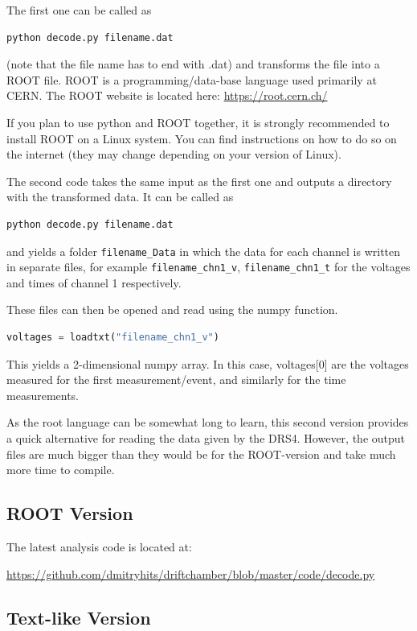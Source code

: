 \documentclass[12pt]{article}
\begin{document}
The first one can be called as
\begin{lstlisting}[language=bash]
  python decode.py filename.dat
\end{lstlisting}
(note that the file name has to end with .dat) and transforms the file into a ROOT file. ROOT is a programming/data-base language used primarily at CERN. The ROOT website is located here:
\url{https://root.cern.ch/}

If you plan to use python and ROOT together, it is strongly recommended to install ROOT on a Linux system. You can find instructions on how to do so on the internet (they may change depending on your version of Linux).

The second code takes the same input as the first one and outputs a directory with the transformed data. It can be called as
\begin{lstlisting}[language=bash]
  python decode.py filename.dat
\end{lstlisting}
and yields a folder \verb|filename_Data| in which the data for each channel is written in separate files, for example \verb|filename_chn1_v|, \verb|filename_chn1_t| for the voltages and times of channel 1 respectively.

These files can then be opened and read using the numpy function.
\begin{lstlisting}[language=Python]
    voltages = loadtxt("filename_chn1_v")
\end{lstlisting}
This yields a 2-dimensional numpy array. In this case, voltages[0] are the voltages measured for the first measurement/event, and similarly for the time measurements.

As the root language can be somewhat long to learn, this second version provides a quick alternative for reading the data given by the DRS4. However, the output files are much bigger than they would be for the ROOT-version and take much more time to compile.

\subsection{ROOT Version}
The latest analysis code is located at:

\url{https://github.com/dmitryhits/driftchamber/blob/master/code/decode.py}


\subsection{Text-like Version}

\end{document}

